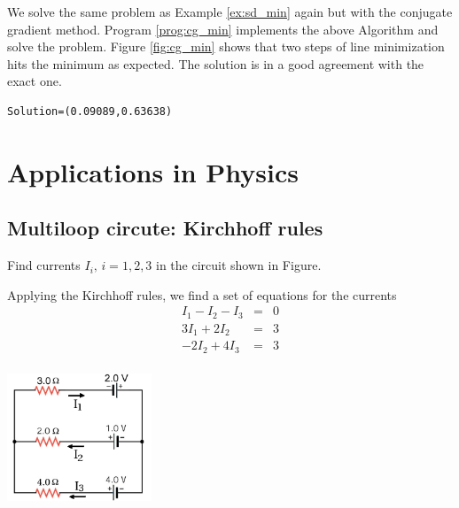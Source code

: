 \bigskip
\begin{example}\label{ex:cg_min}

\medskip
\noindent
We solve the same problem as Example \ref{ex:sd_min} again but with the conjugate gradient method. Program \ref{prog:cg_min} implements the above Algorithm and solve the problem. Figure \ref{fig:cg_min} shows that two steps of line minimization hits the minimum as expected.  The solution is in a good agreement with the exact one.

\begin{mybox}
\small
\begin{verbatim}
Solution=(0.09089,0.63638)
\end{verbatim}
\normalsize
\end{mybox}
\end{example}


\noindent
\section{Applications in Physics}

\subsection{Multiloop circute: Kirchhoff rules}


\begin{minipage}{4in} 
\noindent
Find currents $I_i,\, i=1,2,3$ in the circuit shown in Figure.

\medskip
Applying the Kirchhoff rules, we find a set of equations for the currents
\begin{eqnarray*}
I_1 - I_2 - I_3 &=& 0 \\
3I_1 + 2 I_2 &=& 3 \\
-2 I_2 + 4 I_3 &=& 3\\
\end{eqnarray*}
\end{minipage}
\begin{minipage}{2.0in}
\begin{center}
\includegraphics[width=1.7in]{08.matrix1/kirchhoff.pdf}\\
\end{center}
\end{minipage}

